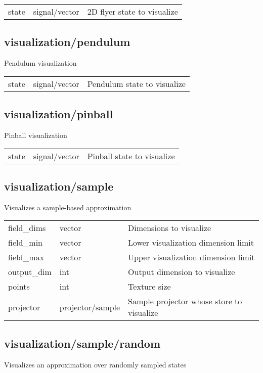 \noindent\begin{tabular}{@{}lll@{}}
state&signal/vector&2D flyer state to visualize\\
\end{tabular}
\subsection{visualization/pendulum}
\noindent Pendulum visualization\\

\noindent\begin{tabular}{@{}lll@{}}
state&signal/vector&Pendulum state to visualize\\
\end{tabular}
\subsection{visualization/pinball}
\noindent Pinball visualization\\

\noindent\begin{tabular}{@{}lll@{}}
state&signal/vector&Pinball state to visualize\\
\end{tabular}
\subsection{visualization/sample}
\noindent Visualizes a sample-based approximation\\

\noindent\begin{tabular}{@{}lll@{}}
field\_dims&vector&Dimensions to visualize\\
field\_min&vector&Lower visualization dimension limit\\
field\_max&vector&Upper visualization dimension limit\\
output\_dim&int&Output dimension to visualize\\
points&int&Texture size\\
projector&projector/sample&Sample projector whose store to visualize\\
\end{tabular}
\subsection{visualization/sample/random}
\noindent Visualizes an approximation over randomly sampled states\\

